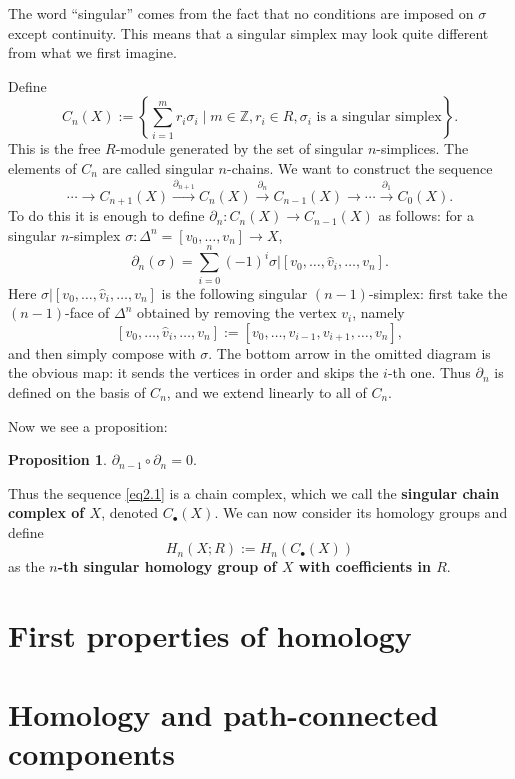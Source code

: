 \documentclass{book}
\theoremstyle{definition}
\newtheorem*{prop}{Proposition}
\newcommand{\Z}{\mathbb{Z}}
\begin{document}
The word ``singular'' comes from the fact that no conditions
are imposed on $\sigma$ except continuity. This means that a
singular simplex may look quite different from what we first
imagine.

Define
$$
C_n(X):=\left\{
\sum_{i=1}^m r_i\sigma_i
\mid m\in\Z,
 r_i\in R,
 \sigma_i\text{ is a singular simplex}
\right\}.
$$
This is the free $R$-module generated by the set of singular
$n$-simplices. The elements of $C_n$ are called singular
$n$-chains. We want to construct the sequence
\begin{equation}\label{eq2.1}
\cdots\to C_{n+1}(X)\xrightarrow{\partial_{n+1}}
C_n(X)\xrightarrow{\partial_n}C_{n-1}(X)
\to\cdots\xrightarrow{\partial_1}C_0(X).
\end{equation}
To do this it is enough to define
$\partial_n:C_n(X)\to C_{n-1}(X)$ as follows: for a singular
$n$-simplex $\sigma:\Delta^n=[v_0,\ldots,v_n]\to X$,
$$
\partial_n(\sigma)=
\sum_{i=0}^n(-1)^i
\sigma|[v_0,\ldots,\hat v_i,\ldots,v_n].
$$
Here $\sigma|[v_0,\ldots,\hat v_i,\ldots,v_n]$ is the
following singular $(n-1)$-simplex: first take the
$(n-1)$-face of $\Delta^n$ obtained by removing the vertex
$v_i$, namely
$$
[v_0,\ldots,\hat v_i,\ldots,v_n]
:=
[v_0,\ldots,v_{i-1},v_{i+1},\ldots,v_n],
$$
and then simply compose with $\sigma$. The bottom arrow in
the omitted diagram is the obvious map: it sends the vertices
in order and skips the $i$-th one. Thus $\partial_n$ is
defined on the basis of $C_n$, and we extend linearly to all
of $C_n$.

Now we see a proposition:

\begin{prop}
$\partial_{n-1}\circ\partial_n=0$.
\end{prop}

Thus the sequence \eqref{eq2.1} is a chain complex, which we
call the \textbf{singular chain complex of $X$}, denoted
$C_\bullet(X)$. We can now consider its homology groups and
define
$$
H_n(X;R):=H_n(C_\bullet(X))
$$
as the \textbf{$n$-th singular homology group of $X$ with
coefficients in $R$}.

\section{First properties of homology}

\section{Homology and path-connected components}
\end{document}
